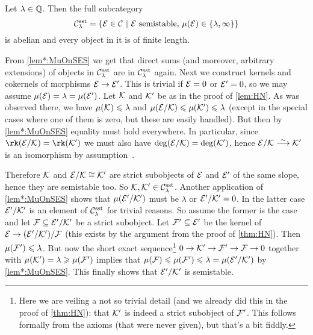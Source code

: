 \documentclass[a4paper, 10pt, oneside, DIV=9, chapterprefix=true, numbers=enddot,bibliography=totoc]{scrbook}
\begin{document}
\begin{prop}\label{prop:Clambdasst}
	Let $\lambda\in \mathbb{Q}$. Then the full subcategory
	\begin{equation*}
		\mathcal{C}_\lambda^{\mathrm{sst}}=\left\{\mathcal{E}\in \mathcal{C}\ \middle|\  \mathcal{E} \text{ semistable, }\mu(\mathcal{E})\in \{\lambda,\infty\}\right\}
	\end{equation*}
	is abelian and every object in it is  of finite length.
\end{prop}
\begin{proof*}
	From \cref{lem*:MuOnSES} we get that direct sums (and moreover, arbitrary extensions) of objects in $\mathcal{C}_\lambda^{\mathrm{sst}}$ are in $\mathcal{C}_\lambda^{\mathrm{sst}}$ again. Next we construct kernels and cokernels of morphisms $\Ee\morphism \Ee'$. This is trivial if $\mathcal{E}=0$ or $\mathcal{E}'=0$, so we may assume $\mu(\mathcal{E})=\lambda=\mu(\mathcal{E}')$. Let $\mathcal{K}$ and $\mathcal{K}'$ be as in the proof of \cref{lem:HN}. As was observed there, we have $\mu(\mathcal{K})\leqslant \lambda$ and $\mu(\mathcal{E}/\mathcal{K})\leqslant \mu(\mathcal{K}')\leqslant \lambda$ (except in the special cases where one of them is zero, but these are easily handled). But then by \cref{lem*:MuOnSES} equality must hold everywhere. In particular, since $\rk(\Ee/\Kk)=\rk(\Kk')$ we must also have $\deg(\mathcal{E}/\mathcal{K})=\deg(\mathcal{K}')$, hence $\Ee/\Kk\isomorphism \Kk'$ is an isomorphism by assumption~.
	
	Therefore $\mathcal{K}$ and $\mathcal{E}/\mathcal{K}\cong \mathcal{K}'$ are strict subobjects of $\mathcal{E}$ and $\mathcal{E}'$ of the same slope, hence they are semistable too. So $\mathcal{K},\mathcal{K}'\in \mathcal{C}_\lambda^{\mathrm{sst}}$. Another application of \cref{lem*:MuOnSES} shows that $\mu(\mathcal{E}'/\mathcal{K}')$ must be $\lambda$ or $\mathcal{E}'/\mathcal{K}'=0$. In the latter case $\mathcal{E}'/\mathcal{K}'$ is an element of $\mathcal{C}_\lambda^{\mathrm{sst}}$ for trivial reasons. So assume the former is the case and let $\mathcal{F}\subseteq \mathcal{E}'/\mathcal{K}'$ be a strict subobject. Let $\mathcal{F}'\subseteq \mathcal{E}'$ be the kernel of $\Ee\morphism (\Ee'/\Kk')/\Ff$ (this exists by the argument from the proof of \cref{thm:HN}). Then $\mu(\mathcal{F}')\leqslant \lambda$. But now the short exact sequence\footnote{Here we are veiling a not so trivial detail (and we already did this in the proof of \cref{thm:HN}): that $\mathcal{K}'$ is indeed a strict subobject of $\mathcal{F}'$. This follows formally from the axioms (that were never given), but that's a bit fiddly.} $0\morphism \Kk'\morphism \Ff'\morphism \Ff\morphism 0$ together with $\mu(\mathcal{K}')=\lambda\geqslant \mu(\mathcal{F}')$ implies that $\mu(\mathcal{F})\leqslant \mu(\mathcal{F}')\leqslant \lambda=\mu(\mathcal{E}'/\mathcal{K}')$ by \cref{lem*:MuOnSES}. This finally shows that $\mathcal{E}'/\mathcal{K}'$ is semistable.
	

\end{proof*}
\end{document}
